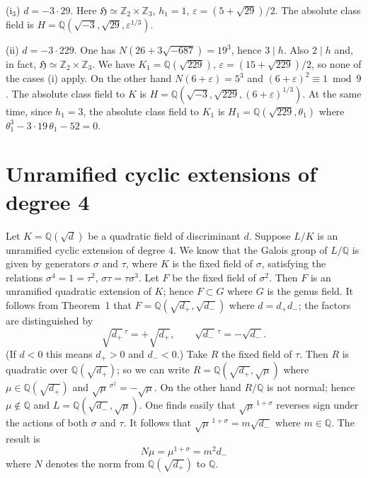 \medskip\noindent
($\mathrm{i}_{3}$) $d=-3\cdot 29$. Here
$\mathfrak{H}\simeq\mathbb{Z}_{2}\times\mathbb{Z}_{3}$, $h_{1}=1$,
$\varepsilon=(5+\sqrt{29})/2$. The absolute class field is
$H=\mathbb{Q}(\sqrt{-3},\sqrt{29},\varepsilon^{1/3})$.

\medskip\noindent
(ii) $d=-3\cdot 229$. One has $N(26+3\sqrt{-687})=19^{3}$, hence
$3\mid h$. Also $2\mid h$ and, in fact,
$\mathfrak{H}\simeq\mathbb{Z}_{2}\times\mathbb{Z}_{3}$. We have
$K_{1}=\mathbb{Q}(\sqrt{229})$, $\varepsilon=(15+\sqrt{229})/2$, so none
of the cases (i) apply. On the other hand $N(6+\varepsilon)=5^{3}$ and
$(6+\varepsilon)^{2}\equiv 1\bmod 9$. The absolute class field to $K$ is
$H=\mathbb{Q}(\sqrt{-3},\sqrt{229},(6+\varepsilon)^{1/3})$. At the same
time, since $h_{1}=3$, the absolute class field to $K_{1}$ is
$H_{1}=\mathbb{Q}(\sqrt{229},\theta_{1})$ where
$\theta_{1}^{3}-3\cdot 19\,\theta_{1}-52=0$.

\section{Unramified cyclic extensions of degree 4}\label{sec:VII-quartic}

Let $K=\mathbb{Q}(\sqrt{d})$ be a quadratic field of discriminant $d$.
Suppose $L/K$ is an unramified cyclic extension of degree $4$. We know
that the Galois group of $L/\mathbb{Q}$ is given by generators $\sigma$
and $\tau$, where $K$ is the fixed field of $\sigma$, satisfying the
relations $\sigma^{4}=1=\tau^{2}$, $\sigma\tau=\tau\sigma^{3}$. Let $F$
be the fixed field of $\sigma^{2}$. Then $F$ is an unramified quadratic
extension of $K$; hence $F\subset G$ where $G$ is the genus field. It
follows from Theorem~1 that
$F=\mathbb{Q}(\sqrt{d_{+}},\sqrt{d_{-}})$ where $d=d_{+}d_{-}$; the
factors are distinguished by
\[
\sqrt{d_{+}}{}^{\,\tau}=+\sqrt{d_{+}},\qquad
\sqrt{d_{-}}{}^{\,\tau}=-\sqrt{d_{-}}.
\]
(If $d<0$ this means $d_{+}>0$ and $d_{-}<0$.) Take $R$ the fixed field
of $\tau$. Then $R$ is quadratic over $\mathbb{Q}(\sqrt{d_{+}})$; so we
can write $R=\mathbb{Q}(\sqrt{d_{+}},\sqrt{\mu})$ where
$\mu\in\mathbb{Q}(\sqrt{d_{+}})$ and
$\sqrt{\mu}^{\,\sigma^{2}}=-\sqrt{\mu}$. On the other hand $R/\mathbb{Q}$
is not normal; hence $\mu\notin\mathbb{Q}$ and
$L=\mathbb{Q}(\sqrt{d_{-}},\sqrt{\mu})$. One finds easily that
$\sqrt{\mu}^{\,1+\sigma}$ reverses sign under the actions of both
$\sigma$ and $\tau$. It follows that
$\sqrt{\mu}^{\,1+\sigma}=m\sqrt{d_{-}}$ where $m\in\mathbb{Q}$. The
result is
\[
N\mu=\mu^{1+\sigma}=m^{2}d_{-}
\]
where $N$ denotes the norm from $\mathbb{Q}(\sqrt{d_{+}})$ to
$\mathbb{Q}$.

